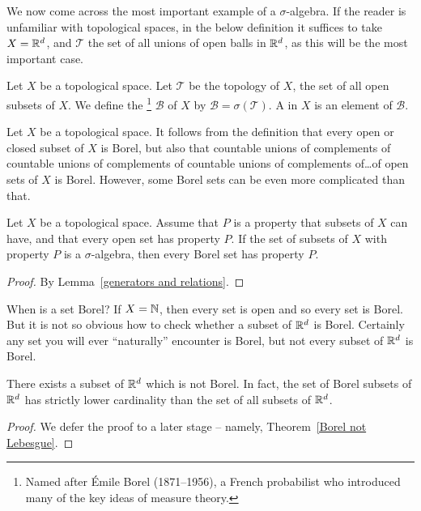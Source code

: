 \begin{subsec}
We now come across the most important example of a $\sigma$-algebra.
If the reader is unfamiliar with topological spaces, in the below definition it suffices to take $X = \mathbb{R}^{d}$, and $\mathcal T$ the set of all unions of open balls in $\mathbb{R}^{d}$, as this will be the most important case.
\end{subsec}

\begin{definition}
Let $X$ be a topological space.
Let $\mathcal T$ be the topology of $X$, the set of all open subsets of $X$.
We define the \footnote{Named after Émile Borel (1871--1956), a French probabilist who introduced many of the key ideas of measure theory.}
$\mathcal B$ of $X$ by $\mathcal B = \sigma(\mathcal T)$.
A  in $X$ is an element of $\mathcal B$.
\end{definition}

\begin{subsec}
Let $X$ be a topological space.
It follows from the definition that every open or closed subset of $X$ is Borel, but also that countable unions of complements of countable unions of complements of countable unions of complements of\dots of open sets of $X$ is Borel.
However, some Borel sets can be even more complicated than that.
\end{subsec}

\begin{lemma}
Let $X$ be a topological space.
Assume that $P$ is a property that subsets of $X$ can have, and that every open set has property $P$.
If the set of subsets of $X$ with property $P$ is a $\sigma$-algebra, then every Borel set has property $P$.
\end{lemma}
\begin{proof}
By Lemma~\ref{generators and relations}.
\end{proof}

\begin{subsec}
When is a set Borel? If $X = \mathbb{N}$, then every set is open and so every set is Borel.
But it is not so obvious how to check whether a subset of $\mathbb{R}^{d}$ is Borel.
Certainly any set you will ever ``naturally'' encounter is Borel, but not every subset of $\mathbb{R}^{d}$ is Borel.
\end{subsec}

\begin{theorem}\label{Borel sigma algebra}
There exists a subset of $\mathbb{R}^{d}$ which is not Borel.
In fact, the set of Borel subsets of $\mathbb{R}^{d}$ has strictly lower cardinality than the set of all subsets of $\mathbb{R}^{d}$.
\end{theorem}
\begin{proof}
We defer the proof to a later stage -- namely, Theorem~\ref{Borel not Lebesgue}.
\end{proof}

